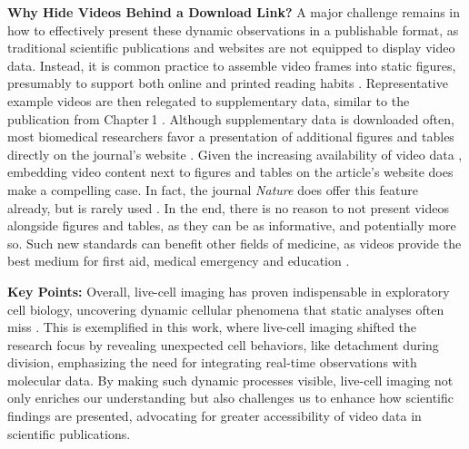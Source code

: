 \textbf{Why Hide Videos Behind a Download Link?} A major challenge remains in
how to effectively present these dynamic observations in a publishable format,
as traditional scientific publications and websites are not equipped to display
video data. Instead, it is common practice to assemble video frames into static
figures, presumably to support both online and printed reading habits
\cite{perasDigitalPaperReading2023}. Representative example videos are then
relegated to supplementary data, similar to the publication from Chapter\,1
\cite{kuricModelingMyelomaDissemination2024}. Although supplementary data is
downloaded often, most biomedical researchers favor a presentation of additional
figures and tables directly on the journal's website
\cite{priceRoleSupplementaryMaterial2018}. Given the increasing availability of
video data%
, %
embedding video content next to figures and tables on the article's website does
make a compelling case. In fact, the journal \emph{Nature} does offer this
feature already, but is rarely used \cite{NatureVideoContent}. In the end, there is
no reason to not present videos alongside figures and tables, as they can be as
informative, and potentially more so. Such new standards can benefit other
fields of medicine, as videos provide the best medium for first aid, medical
emergency and education \cite{guptaDatasetMedicalInstructional2023}.

\textbf{Key Points:} Overall, live-cell imaging has proven indispensable in
exploratory cell biology, uncovering dynamic cellular phenomena that static
analyses often miss . This is exemplified in this work, where
live-cell imaging shifted the research focus by revealing unexpected cell
behaviors, like detachment during division, emphasizing the need for integrating
real-time observations with molecular data. By making such dynamic processes
visible, live-cell imaging not only enriches our understanding but also
challenges us to enhance how scientific findings are presented, advocating for
greater accessibility of video data in scientific publications.

\newpage


